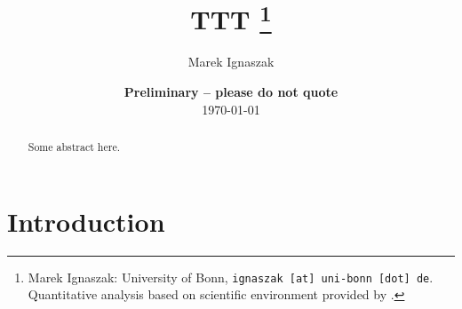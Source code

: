 \documentclass[11pt, a4paper, fleqn]{article}
\begin{document}
\title{TTT
\thanks{Marek Ignaszak: University of Bonn, {\nolinkurl{ignaszak [at] uni-bonn [dot] de}}. Quantitative analysis based on scientific environment provided by \citet{GaudeckerEconProjectTemplates}.}
}

\author{Marek Ignaszak
}

\date{
{\bf Preliminary -- please do not quote}
\\[1ex]
\today
}

\maketitle


\begin{abstract}
	Some abstract here.
\end{abstract}
\clearpage

\section{Introduction} %
\label{sec:introduction}



\printbibliography
{}
\end{document}
